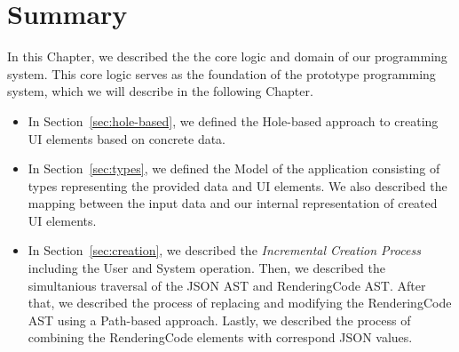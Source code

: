 \newpage
\section{Summary}

In this Chapter, we described the the core logic and domain of our programming system.
This core logic serves as the foundation of the prototype programming system, which we will describe in the following Chapter.
\begin{itemize}
	\item In Section~\ref{sec:hole-based}, we defined the Hole-based approach to creating UI elements based on concrete data.

	\item In Section~\ref{sec:types}, we defined the Model of the application consisting of types representing the provided data and UI elements.
	      We also described the mapping between the input data and our internal representation of created UI elements.

	\item In Section~\ref{sec:creation}, we described the \emph{Incremental Creation Process} including the User and System operation.
	      Then, we described the simultanious traversal of the JSON AST and RenderingCode AST.
	      After that, we described the process of replacing and modifying the RenderingCode AST using a Path-based approach.
	      Lastly, we described the process of combining the RenderingCode elements with correspond JSON values.
\end{itemize}
